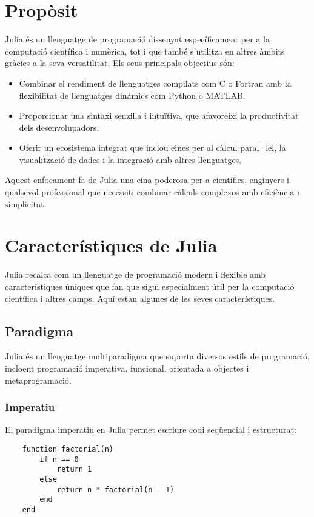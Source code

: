 \documentclass[a4paper]{article}
\begin{document}
\section{Propòsit}
Julia és un llenguatge de programació dissenyat específicament per a la computació científica i numèrica, tot i que també s'utilitza en altres àmbits gràcies a la seva versatilitat. Els seus principals objectius són:
\begin{itemize}
    \item Combinar el rendiment de llenguatges compilats com C o Fortran amb la flexibilitat de llenguatges dinàmics com Python o MATLAB.
    \item Proporcionar una sintaxi senzilla i intuïtiva, que afavoreixi la productivitat dels desenvolupadors.
    \item Oferir un ecosistema integrat que inclou eines per al càlcul paral·lel, la visualització de dades i la integració amb altres llenguatges.
\end{itemize}
Aquest enfocament fa de Julia una eina poderosa per a científics, enginyers i qualsevol professional que necessiti combinar càlculs complexos amb eficiència i simplicitat.

\section{Característiques de Julia}
Julia recalca com un llenguatge de programació modern i flexible amb característiques úniques que fan que sigui especialment útil per la computació científica i altres camps. Aquí estan algunes de les seves característiques.

\subsection{Paradigma}
Julia és un llenguatge multiparadigma que suporta diversos estils de programació, incloent programació imperativa, funcional, orientada a objectes i metaprogramació.
\newpage

\subsubsection{Imperatiu}
El paradigma imperatiu en Julia permet escriure codi seqüencial i estructurat:

\begin{verbatim}
    function factorial(n)
        if n == 0
            return 1
        else
            return n * factorial(n - 1)
        end
    end
    \end{verbatim}
\end{document}
